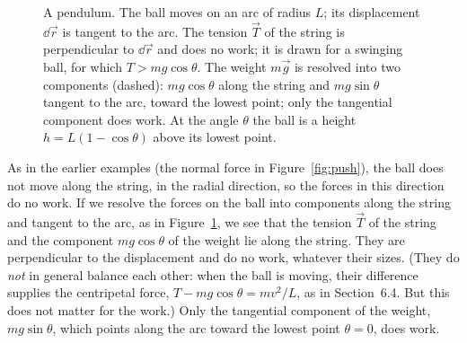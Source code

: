\documentclass[11pt,a4paper]{article}
\begin{document}
\begin{figure}[ht]
\centering
\begin{minipage}[c]{0.5\textwidth}
\centering
{}
\end{minipage}\hfill
\begin{minipage}[c]{0.46\textwidth}
\caption{A pendulum. The ball moves on an arc of radius $L$; its displacement $\dd\vec{r}$ is tangent
to the arc. The tension $\vec{T}$ of the string is perpendicular to $\dd\vec{r}$ and does no work; it is drawn
for a swinging ball, for which $T > mg\cos\theta$. The weight $m\vec{g}$ is resolved into two
components (dashed): $mg\cos\theta$ along the string and $mg\sin\theta$ tangent to the arc, toward
the lowest point; only the tangential component does work. At the angle $\theta$ the ball is a height $h = L(1 - \cos\theta)$ above its lowest
point.}\label{fig:pendulum}
\end{minipage}
\end{figure}

As in the earlier examples (the normal force in Figure~\ref{fig:push}), the ball does not move along
the string, in the radial direction, so the forces in this direction do no work. If we resolve the
forces on the ball into components along the string and tangent to the arc, as in
Figure~\ref{fig:pendulum}, we see that the tension $\vec{T}$ of the string and the component
$mg\cos\theta$ of the weight lie along the string. They are perpendicular to the displacement and do
no work, whatever their sizes. (They do \emph{not} in general balance each other: when the ball is
moving, their difference supplies the centripetal force, $T - mg\cos\theta = mv^2/L$, as in
Section~6.4. But this does not matter for the work.) Only the tangential component of the weight,
$mg\sin\theta$, which points along the arc toward the lowest point $\theta = 0$, does work.
\end{document}
